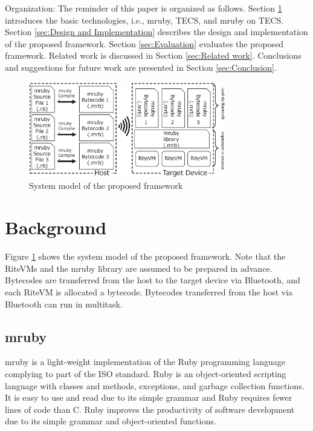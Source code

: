 \documentclass{sig-alternate-05-2015}
\begin{document}
{\mybf Organization}: The reminder of this paper is organized as follows.
Section \ref{sec:Background} introduces the basic technologies, i.e., mruby, TECS, and mruby on TECS.
Section \ref{sec:Design and Implementation} describes the design and implementation of the proposed framework.
Section \ref{sec:Evaluation} evaluates the proposed framework.
Related work is discussed in Section \ref{sec:Related work}.
Conclusions and suggestions for future work are presented in Section \ref{sec:Conclusion}.


\begin{figure}[t]
    \centering
    \includegraphics[width=8.6cm,clip]{figure/proposed.eps}
    \vspace{0.5mm}
    \caption{System model of the proposed framework}
    \vspace{1mm}
    \label{fig:proposed}
\end{figure}

\section{Background}
\label{sec:Background}
Figure \ref{fig:proposed} shows the system model of the proposed framework.
Note that the RiteVMs and the mruby library are assumed to be prepared in advance.
Bytecodes are transferred from the host to the target device via Bluetooth, and each RiteVM is allocated a bytecode.
Bytecodes transferred from the host via Bluetooth can run in multitask.

\subsection{mruby}
\label{sec:mruby}
mruby is a light-weight implementation of the Ruby programming language complying to part of the ISO standard.
Ruby is an object-oriented scripting language \cite{url:Ruby} with classes and methods, exceptions, and garbage collection functions.
It is easy to use and read due to its simple grammar and Ruby requires fewer lines of code than C.
Ruby improves the productivity of software development due to its simple grammar and object-oriented functions.
\end{document}
